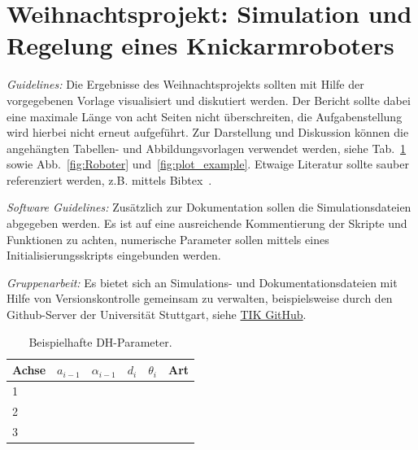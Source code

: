 \documentclass{MSM_latex}
\author{I. Musterfrau, T. Mustermann}
\begin{document}
\section*{Weihnachtsprojekt: Simulation und Regelung eines Knickarmroboters}

\textit{Guidelines:} Die Ergebnisse des Weihnachtsprojekts sollten mit Hilfe der vorgegebenen Vorlage  visualisiert und diskutiert werden. 
Der Bericht sollte dabei eine maximale Länge von acht Seiten nicht überschreiten, die Aufgabenstellung wird hierbei nicht erneut aufgeführt. 
Zur Darstellung und Diskussion können die angehängten Tabellen- und Abbildungsvorlagen verwendet werden, siehe Tab.~\ref{tab:DH} sowie Abb.~\ref{fig:Roboter} und~\ref{fig:plot_example}. 
Etwaige Literatur sollte sauber referenziert werden, z.B. mittels Bibtex~\cite{FehrSchmidSchneiderEberhard20,Fuchs23, DenavitHartenberg55,Lipkin05}.

\textit{Software Guidelines:}
Zusätzlich zur Dokumentation sollen die Simulationsdateien abgegeben werden.
Es ist auf eine ausreichende Kommentierung der Skripte und Funktionen zu achten, numerische Parameter sollen mittels eines Initialisierungsskripts eingebunden werden.

\textit{Gruppenarbeit:}
Es bietet sich an Simulations- und Dokumentationsdateien mit Hilfe von Versionskontrolle gemeinsam zu verwalten, beispielsweise durch den Github-Server der Universität Stuttgart, siehe \href{https://www.tik.uni-stuttgart.de/dienste-a-z/Git-Hosting/}{TIK GitHub}.




\clearpage
\begin{table}[tb]
	\centering
	\begin{tabular}{lccccr}
		\toprule
		Achse & $a_{i-1}$ & $\alpha_{i-1}$ & $d_i$ & $\theta_i$ & Art \\
		\midrule
		1 & & & & &  \\
		2 & & & & &  \\
		3 & & & & &  \\
		\bottomrule
	\end{tabular}
	\caption{Beispielhafte DH-Parameter.}
	\label{tab:DH}
\end{table}
\end{document}
